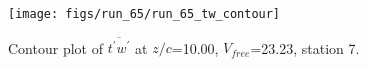 \begin{figure}[H]
\centering
\texttt{[image: figs/run\_65/run\_65\_tw\_contour]}
\caption{Contour plot of $\overline{t^\prime w^\prime}$ at $z/c$=10.00, $V_{free}$=23.23, station 7.}
\label{fig:run_65_tw_contour}
\end{figure}


